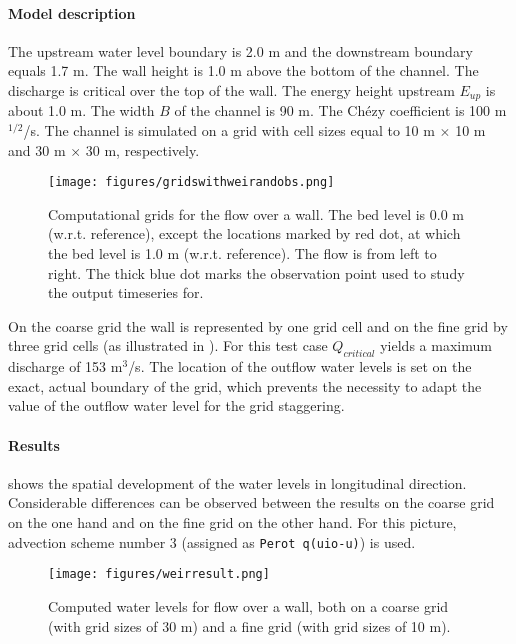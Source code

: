 \paragraph*{Model description}
The upstream water level boundary is 2.0 m and the downstream boundary equals 1.7 m. The wall height is 1.0 m above the bottom of the channel. The discharge is critical over the top of the wall. The energy height upstream $E_{up}$ is about 1.0 m. The width $B$ of the channel is 90 m. The Ch\'ezy coefficient is 100 m$^{1/2}$/s. The channel is simulated on a grid with cell sizes equal to 10 m $\times$ 10 m and 30 m $\times$ 30 m, respectively. 

\begin{figure}[h!]
\begin{center}
\texttt{[image: figures/gridswithweirandobs.png]}
\end{center}\caption{Computational grids for the flow over a wall. The bed level is 0.0 m (w.r.t. reference), except the locations marked by red dot, at which the bed level is 1.0 m (w.r.t. reference). The flow is from left to right. The thick blue dot marks the observation point used to study the output timeseries for. \label{fig:gridswithwallandobs}}
\end{figure}

On the coarse grid the wall is represented by one grid cell and on the fine grid by three grid cells (as illustrated in ). For this test case $Q_{critical}$ yields a maximum discharge of 153 m$^3$/s. The location of the outflow water levels is set on the exact, actual boundary of the grid, which prevents the necessity to adapt the value of the outflow water level for the grid staggering.





\paragraph*{Results}
 shows the spatial development of the water levels in longitudinal direction. Considerable differences can be observed between the results on the coarse grid on the one hand and on the fine grid on the other hand. For this picture, advection scheme number 3 (assigned as \texttt{Perot q(uio-u)}) is used.

\begin{figure}[h!]
\begin{center}
\texttt{[image: figures/weirresult.png]}
\end{center}\caption{Computed water levels for flow over a wall, both on a coarse grid (with grid sizes of 30 m) and a fine grid (with grid sizes of 10 m). \label{fig:wallresult}}
\end{figure}

